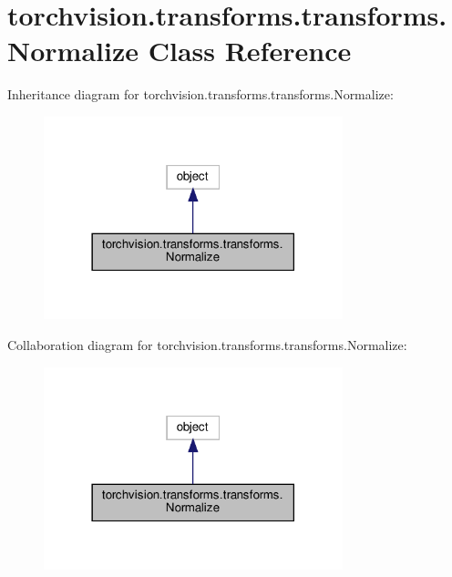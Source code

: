 \hypertarget{classtorchvision_1_1transforms_1_1transforms_1_1Normalize}{}\section{torchvision.\+transforms.\+transforms.\+Normalize Class Reference}
\label{classtorchvision_1_1transforms_1_1transforms_1_1Normalize}


Inheritance diagram for torchvision.\+transforms.\+transforms.\+Normalize\+:
\nopagebreak
\begin{figure}[H]
\begin{center}
\leavevmode
\includegraphics[width=246pt]{classtorchvision_1_1transforms_1_1transforms_1_1Normalize__inherit__graph}
\end{center}
\end{figure}


Collaboration diagram for torchvision.\+transforms.\+transforms.\+Normalize\+:
\nopagebreak
\begin{figure}[H]
\begin{center}
\leavevmode
\includegraphics[width=246pt]{classtorchvision_1_1transforms_1_1transforms_1_1Normalize__coll__graph}
\end{center}
\end{figure}
